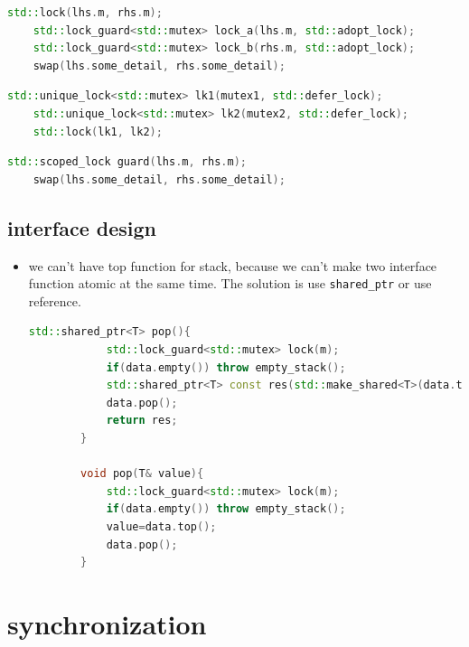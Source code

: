 \documentclass[a4paper,11pt,twoside]{book}
\begin{document}
\begin{itemize}
\begin{lstlisting}[frame=single, language=c++]
	std::lock(lhs.m, rhs.m);
	std::lock_guard<std::mutex> lock_a(lhs.m, std::adopt_lock);
	std::lock_guard<std::mutex> lock_b(rhs.m, std::adopt_lock);
	swap(lhs.some_detail, rhs.some_detail);
\end{lstlisting}

\begin{lstlisting}[frame=single, language=c++]	
	std::unique_lock<std::mutex> lk1(mutex1, std::defer_lock);
	std::unique_lock<std::mutex> lk2(mutex2, std::defer_lock);
	std::lock(lk1, lk2);
\end{lstlisting}


\begin{lstlisting}[frame=single, language=c++]
	std::scoped_lock guard(lhs.m, rhs.m);
	swap(lhs.some_detail, rhs.some_detail);
\end{lstlisting}	
	
\end{itemize}

\subsection{interface design}
\begin{itemize}
	
	\item we can't have top function for stack, because we can't make two interface function atomic at the same time. The solution is use \texttt{shared\_ptr} or use reference.
	
	\begin{lstlisting}[frame=single, language=c++]
		std::shared_ptr<T> pop(){
			std::lock_guard<std::mutex> lock(m);
			if(data.empty()) throw empty_stack();
			std::shared_ptr<T> const res(std::make_shared<T>(data.top()));
			data.pop();
			return res;
		}
		
		void pop(T& value){
			std::lock_guard<std::mutex> lock(m);
			if(data.empty()) throw empty_stack();
			value=data.top();
			data.pop();
		}	
	\end{lstlisting}	
	
\end{itemize}


\section{synchronization}
\end{document}
